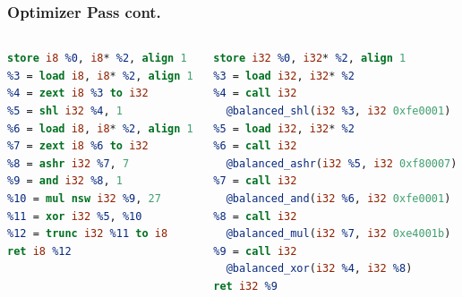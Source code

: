 \documentclass[11pt,t,usepdftitle=false,aspectratio=169]{beamer}
\begin{document}
\begin{frame}[fragile]
  \frametitle{Optimizer Pass cont.}

  \begin{columns}[T]
    \begin{column}{0.48\textwidth}
      \begin{lstlisting}[language=LLVM, basicstyle=\small]
%2 = alloca i8, align 1
store i8 %0, i8* %2, align 1
%3 = load i8, i8* %2, align 1
%4 = zext i8 %3 to i32
%5 = shl i32 %4, 1
%6 = load i8, i8* %2, align 1
%7 = zext i8 %6 to i32
%8 = ashr i32 %7, 7
%9 = and i32 %8, 1
%10 = mul nsw i32 %9, 27
%11 = xor i32 %5, %10
%12 = trunc i32 %11 to i8
ret i8 %12
      \end{lstlisting}
    \end{column}
    \hfill
    \begin{column}{0.48\textwidth}
      \begin{lstlisting}[language=LLVM, basicstyle=\small]
%2 = alloca i32
store i32 %0, i32* %2, align 1
%3 = load i32, i32* %2
%4 = call i32
  @balanced_shl(i32 %3, i32 0xfe0001)
%5 = load i32, i32* %2
%6 = call i32
  @balanced_ashr(i32 %5, i32 0xf80007)
%7 = call i32
  @balanced_and(i32 %6, i32 0xfe0001)
%8 = call i32
  @balanced_mul(i32 %7, i32 0xe4001b)
%9 = call i32
  @balanced_xor(i32 %4, i32 %8)
ret i32 %9
      \end{lstlisting}
    \end{column}
  \end{columns}
\end{frame}
\end{document}

